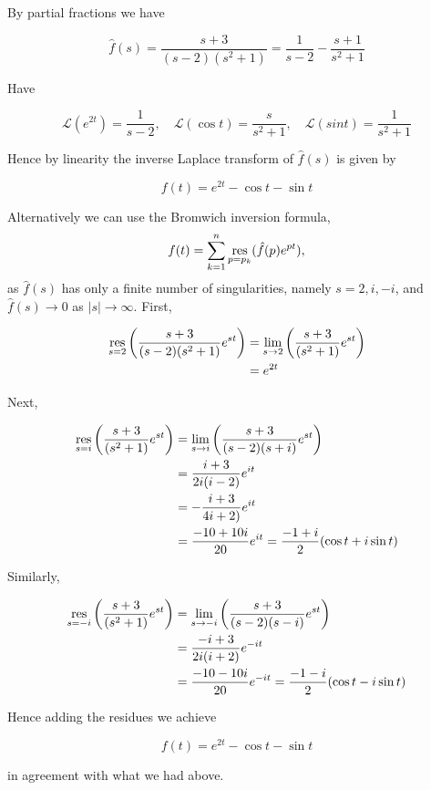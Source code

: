 \documentclass[a4paper]{article}
\begin{document}
By partial fractions we have

\[ \hat{f}(s) = \frac{s+3}{(s-2)(s^{2} + 1)} = \frac{1}{s-2} - \frac{s+1}{s^{2} + 1} \]

Have 

\[ \mathcal{L}(e^{2t}) = \frac{1}{s-2}, \quad \mathcal{L}(\cos t) = \frac{s}{s^{2} + 1}, \quad \mathcal{L}(sin t) = \frac{1}{s^{2} + 1}  \]

Hence by linearity the inverse Laplace transform of $ \hat{f}(s) $ is given by

\[ f(t) = e^{2t} - \cos t - \sin t \]


Alternatively we can use the Bromwich inversion formula,
\[
f(t) = \sum_{k = 1}^n \operatorname*{res}_{p = p_k} (\hat{f}(p) e^{pt}),
\]
as $ \hat{f}(s) $ has only a finite number of singularities, namely $ s = 2, i, -i $, and $ \hat{f}(s) \to 0 $ as $ | s | \to \infty $. First,

\begin{align*}
\operatorname*{res}_{s = 2} \left( \frac{s+3}{(s-2)(s^{2} + 1)} e^{st} \right)  & = \lim\limits_{s \to 2} \left( \frac{s+3}{(s^{2} + 1)} e^{st} \right) \\
& = e^{2t}
\end{align*}

Next,

\begin{align*}
\operatorname*{res}_{s = i} \left( \frac{s+3}{(s^{2} + 1)} e^{st} \right)  & = \lim\limits_{s \to i}  \left( \frac{s+3}{(s-2)(s+i)} e^{st} \right)\\
& = \frac{i+3}{2i(i-2)} e^{it} \\
& = - \frac{i+3}{4i + 2)} e^{it} \\
& = \frac{-10 + 10i}{20} e^{it} = \frac{-1+i}{2} ( \cos t + i \sin t)
\end{align*}

Similarly,

\begin{align*}
\operatorname*{res}_{s = -i} \left( \frac{s+3}{(s^{2} + 1)} e^{st} \right)  & = \lim\limits_{s \to -i}  \left( \frac{s+3}{(s-2)(s-i)} e^{st} \right)\\
& = \frac{-i+3}{2i(i+2)} e^{-it} \\
& = \frac{-10 - 10i}{20} e^{-it} = \frac{-1-i}{2} ( \cos t - i \sin t)
\end{align*}

Hence adding the residues we achieve 

\[ f(t) = e^{2t} - \cos t - \sin t \]

in agreement with what we had above.
\end{document}
